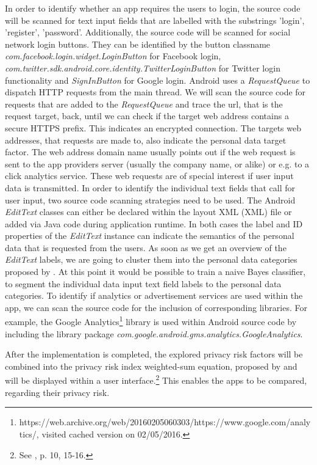 \documentclass[
	a4paper,
	oneside,
	12pt,
	liststotocnumbered
]{article}
\let\cite\textcite
\begin{document}
In order to identify whether an app requires the users to login, the source code will be scanned for text input fields that are labelled with the substrings 'login', 'register', 'password'. 
Additionally, the source code will be scanned for social network login buttons.
They can be identified by the button classname \textit{com.facebook.login.widget.LoginButton} for Facebook login, \textit{com.twitter.sdk.android.core.identity.TwitterLoginButton} for Twitter login functionality and \textit{SignInButton} for Google login.
Android uses a \textit{RequestQueue} to dispatch HTTP requests from the main thread. 
We will scan the source code for requests that are added to the \textit{RequestQueue} and trace the url, that is the request target, back, until we can check if the target web address contains a secure HTTPS prefix.
This indicates an encrypted connection.
The targets web addresses, that requests are made to, also indicate the personal data target factor. The web address domain name usually points out if the web request is sent to the app providers server (usually the company name, or alike) or e.g. to a click analytics service.
These web requests are of special interest if user input data is transmitted.
In order to identify the individual text fields that call for user input, two source code scanning strategies need to be used.
The Android \textit{EditText} classes can either be declared within the layout \acl{XML} (\acs{XML}) file or added via Java code during application runtime.
In both cases the label and ID properties of the \textit{EditText} instance can indicate the semantics of the personal data that is requested from the users.
As soon as we get an overview of the \textit{EditText} labels, we are going to cluster them into the personal data categories proposed by \cite{Bruggemann2016}.
At this point it would be possible to train a naive Bayes classifier, to segment the individual data input text field labels to the personal data categories.
To identify if analytics or advertisement services are used within the app, we can scan the source code for the inclusion of corresponding libraries. For example, the Google Analytics\footnote{https://web.archive.org/web/20160205060303/https://www.google.com/analytics/, visited cached version on 02/05/2016.} library is used within Android source code by including the library package \textit{com.google.android.gms.analytics.GoogleAnalytics}.

After the implementation is completed, the explored privacy risk factors will be combined into the privacy risk index weighted-sum equation, proposed by \cite{Bruggemann2016} and will be displayed within a user interface.\footnote{See \cite{Bruggemann2016}, p. 10, 15-16.}
This enables the \mH apps to be compared, regarding their privacy risk.
\end{document}
